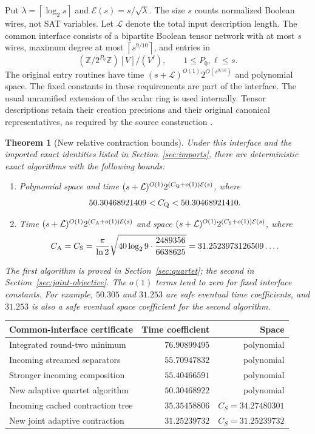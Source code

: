 \documentclass[11pt,letterpaper]{article}
\newtheorem{theorem}{Theorem}[section]
\theoremstyle{remark}\newtheorem{remark}[theorem]{Remark}
\newcommand{\ceil}[1]{\left\lceil #1\right\rceil}
\newcommand{\E}{\mathcal E}
\begin{document}
Put $\lambda=\ceil{\log_2s}$ and
$\E(s)=s/\sqrt\lambda$. The size $s$ counts normalized Boolean wires,
not SAT variables. Let $\mathcal L$ denote the total input description
length. The common interface consists of a bipartite Boolean tensor network
with at most $s$ wires, maximum degree at most $\ceil{s^{9/10}}$, and
entries in
\[
 (\mathbb Z/2^{P_0}\mathbb Z)[V]/(V^\ell),\qquad 1\le P_0,\ell\le s.
\]
The original entry routines have time
$(s+\mathcal L)^{O(1)}2^{O(s^{9/10})}$ and polynomial space.
The fixed constants in these requirements are part of the interface.
The usual unramified extension of the scalar ring is used internally.
Tensor descriptions retain their creation precisions and their original
canonical representatives, as required by the source construction
\cite{upstream,asymmetric}.

\begin{theorem}[New relative contraction bounds]\label{thm:main}
Under this interface and the imported exact identities listed in
Section~\ref{sec:imports}, there are deterministic exact algorithms with
the following bounds:
\begin{enumerate}
\item Polynomial space and time
$(s+\mathcal L)^{O(1)}2^{(C_{\rm Q}+o(1))\E(s)}$, where
\[
 50.30468921409<C_{\rm Q}<50.30468921410.
\]
\item Time $(s+\mathcal L)^{O(1)}2^{(C_{\rm A}+o(1))\E(s)}$ and
space $(s+\mathcal L)^{O(1)}2^{(C_{\rm S}+o(1))\E(s)}$, where
\[
 C_{\rm A}=C_{\rm S}=\frac{\pi}{\ln2}
 \sqrt{40\log_2 9\cdot\frac{2489356}{6638625}}
 =31.2523973126509\ldots .
\]
\end{enumerate}
The first algorithm is proved in Section~\ref{sec:quartet}; the second in
Section~\ref{sec:joint-objective}. The $o(1)$ terms tend to zero for fixed
interface constants. For example, $50.305$ and $31.253$ are safe eventual
time coefficients, and $31.253$ is also a safe eventual space coefficient for
the second algorithm.
\end{theorem}

\begin{center}
\begin{tabular}{@{}p{}rr@{}}
\toprule
Common-interface certificate & Time coefficient & Space\\\midrule
Integrated round-two minimum & $76.90899495$ & polynomial\\
Incoming streamed separators & $55.70947832$ & polynomial\\
Stronger incoming composition & $55.40466591$ & polynomial\\
New adaptive quartet algorithm & $\mathbf{50.30468922}$ & polynomial\\\midrule
Incoming cached contraction tree & $35.35458806$ & $C_S=34.27480301$\\
New joint adaptive contraction & $\mathbf{31.25239732}$ & $C_S=31.25239732$\\
\bottomrule
\end{tabular}
\end{center}
\end{document}
